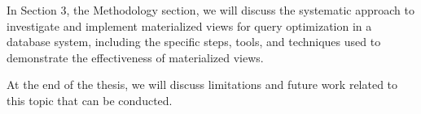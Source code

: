 In Section 3, the Methodology section, we will discuss the systematic approach to investigate and implement materialized views for query optimization in a database system, including the specific steps, tools, and techniques used to demonstrate the effectiveness of materialized views.\vspace{.4cm}

At the end of the thesis, we will discuss limitations and future work related to this topic that can be conducted.










